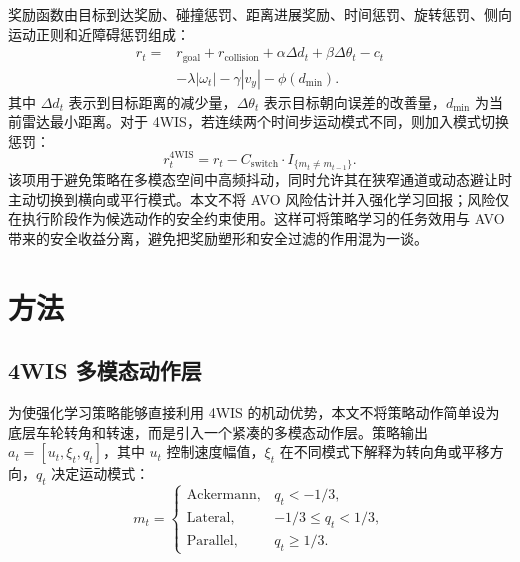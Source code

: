 \documentclass[UTF8,10pt,a4paper,twocolumn]{ctexart}
\begin{document}
奖励函数由目标到达奖励、碰撞惩罚、距离进展奖励、时间惩罚、旋转惩罚、侧向运动正则和近障碍惩罚组成：
\begin{equation}
\begin{aligned}
    r_t =& r_{\mathrm{goal}} + r_{\mathrm{collision}} + \alpha \Delta d_t
    + \beta \Delta \theta_t - c_t \\
    &- \lambda |\omega_t| - \gamma |v_y| - \phi(d_{\min}).
\end{aligned}
\end{equation}
其中 $\Delta d_t$ 表示到目标距离的减少量，$\Delta \theta_t$ 表示目标朝向误差的改善量，$d_{\min}$ 为当前雷达最小距离。对于 4WIS，若连续两个时间步运动模式不同，则加入模式切换惩罚：
\begin{equation}
    r_t^{\mathrm{4WIS}}=r_t-C_{\mathrm{switch}}\cdot I_{\{m_t\ne m_{t-1}\}}.
\end{equation}
该项用于避免策略在多模态空间中高频抖动，同时允许其在狭窄通道或动态避让时主动切换到横向或平行模式。本文不将 AVO 风险估计并入强化学习回报；风险仅在执行阶段作为候选动作的安全约束使用。这样可将策略学习的任务效用与 AVO 带来的安全收益分离，避免把奖励塑形和安全过滤的作用混为一谈。

\section{方法}

\subsection{4WIS 多模态动作层}

为使强化学习策略能够直接利用 4WIS 的机动优势，本文不将策略动作简单设为底层车轮转角和转速，而是引入一个紧凑的多模态动作层。策略输出 $a_t=[u_t,\xi_t,q_t]$，其中 $u_t$ 控制速度幅值，$\xi_t$ 在不同模式下解释为转向角或平移方向，$q_t$ 决定运动模式：
\begin{equation}
m_t=
\begin{cases}
\mathrm{Ackermann}, & q_t<-1/3,\\
\mathrm{Lateral}, & -1/3\le q_t<1/3,\\
\mathrm{Parallel}, & q_t\ge 1/3.
\end{cases}
\end{equation}
\end{document}
